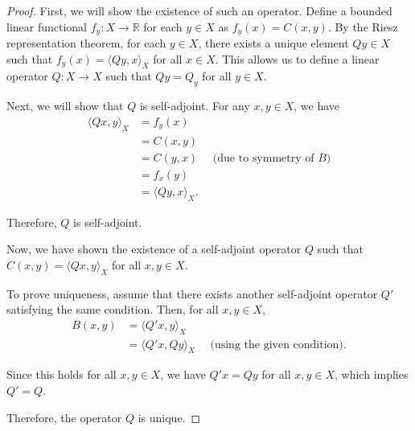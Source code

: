 \documentclass{article}
\theoremstyle{definition}
\begin{document}
\begin{proof}
First, we will show the existence of such an operator. Define a bounded linear functional $f_y : X \rightarrow \mathbb{R}$ for each $y \in X$ as $f_y(x) = C(x, y)$. By the Riesz representation theorem, for each $y \in X$, there exists a unique element $Qy \in X$ such that $f_y(x) = \langle Qy, x \rangle_X$ for all $x \in X$. This allows us to define a linear operator $Q : X \rightarrow X$ such that $Qy = Q_y$ for all $y \in X$.

Next, we will show that $Q$ is self-adjoint. For any $x, y \in X$, we have
\begin{align*}
\langle Qx, y \rangle_X &= f_y(x) \\
&= C(x, y) \\
&= C(y, x) \quad \text{ (due to symmetry of } B)\\
&= f_x(y) \\
&= \langle Qy, x \rangle_X.
\end{align*}

Therefore, $Q$ is self-adjoint.

Now, we have shown the existence of a self-adjoint operator $Q$ such that $C(x, y) = \langle Qx, y \rangle_X$ for all $x, y \in X$.

To prove uniqueness, assume that there exists another self-adjoint operator $Q'$ satisfying the same condition. Then, for all $x, y \in X$,
\begin{align*}
B(x, y) &= \langle Q'x, y \rangle_X \\
&= \langle Q'x, Qy \rangle_X \quad \text{ (using the given condition)}.
\end{align*}

Since this holds for all $x, y \in X$, we have $Q'x = Qy$ for all $x, y \in X$, which implies $Q' = Q$.

Therefore, the operator $Q$ is unique.

\end{proof}
\end{document}
